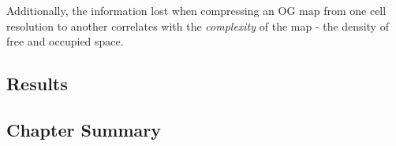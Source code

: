 \chapter{}
\label{chapter5}

Additionally, the
information lost when compressing an OG map from one cell resolution to another
correlates with the \textit{complexity} of the map - the density of free and
occupied space.




\section{Results}

\section{Chapter Summary}
